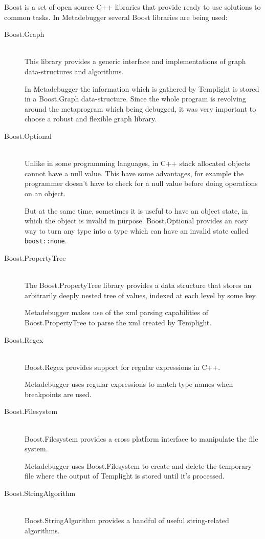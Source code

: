 Boost is a set of open source C++ libraries that provide ready to use solutions
to common tasks. In Metadebugger several Boost libraries are being used:
\begin{description}
    \item[Boost.Graph]\cite{boost-graph} \hfill \\
        This library provides a generic interface and implementations of graph
        data-structures and algorithms.

        In Metadebugger the information which is gathered by Templight is
        stored in a Boost.Graph data-structure. Since the whole program is
        revolving around the metaprogram which being debugged, it was very
        important to choose a robust and flexible graph library.
    \item[Boost.Optional]\cite{boost-optional} \hfill \\
        Unlike in some programming languages, in C++ stack allocated objects
        cannot have a null value. This have some advantages, for example the
        programmer doesn't have to check for a null value before doing
        operations on an object.

        But at the same time, sometimes it is useful to have an object state,
        in which the object is invalid in purpose. Boost.Optional provides an
        easy way to turn any type into a type which can have an invalid state
        called \texttt{boost::none}.
    \item[Boost.PropertyTree]\cite{boost-pt} \hfill \\
        The Boost.PropertyTree library provides a data structure that stores an
        arbitrarily deeply nested tree of values, indexed at each level by some
        key.

        Metadebugger makes use of the xml parsing capabilities of
        Boost.PropertyTree to parse the xml created by Templight.
    \item[Boost.Regex]\cite{boost-regex} \hfill \\
        Boost.Regex provides support for regular expressions in C++.

        Metadebugger uses regular expressions to match type names when
        breakpoints are used.
    \item[Boost.Filesystem]\cite{boost-fs} \hfill \\
        Boost.Filesystem provides a cross platform interface to manipulate the
        file system.

        Metadebugger uses Boost.Filesystem to create and delete the temporary
        file where the output of Templight is stored until it's processed.
    \item[Boost.StringAlgorithm]\cite{boost-string} \hfill \\
        Boost.StringAlgorithm provides a handful of useful string-related
        algorithms.


\end{description}
